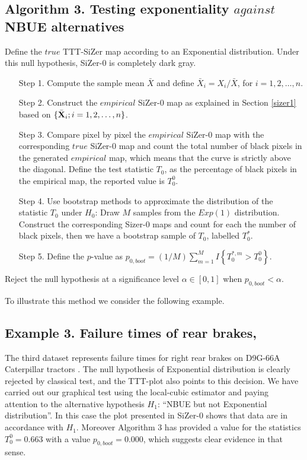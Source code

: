 \documentclass[preprint,12pt]{elsarticle}
\begin{document}
\subsection*{Algorithm 3. Testing exponentiality $against$ NBUE alternatives} 
Define the $true$ TTT-SiZer map according to an Exponential distribution. Under this null hypothesis, SiZer-0 is completely dark gray. 
\begin{enumerate}
\item[Step 1.] Compute the sample mean $\bar{X}$ and define $\bar{X}_i=X_i/\bar{X}$, for $ i=1,2,\ldots,n$.
\item[Step 2.] Construct the  $empirical$ SiZer-$0$ map as explained in Section \ref{sizer1} based on  $\{\bar{\bf X}_i; i=1, 2,\ldots, n \}$.
\item[Step 3.] Compare pixel by pixel the $empirical$ SiZer-$0$ map with the corresponding $true$ SiZer-$0$ map and count the total number of black pixels in the generated $empirical$ map, which means that the curve is strictly above the diagonal. Define the test statistic $T_0$, as the percentage of black pixels in the empirical map, the reported value is $T_0^0$.

\item[Step 4.] Use bootstrap methods to approximate the distribution of the statistic $T_0$ under $H_0$: Draw $M$ samples from the $Exp(1)$ distribution. Construct the corresponding Sizer-$0$ maps and count for each the number of black pixels, then we have a bootstrap sample of $T_0$, labelled $T^*_0$.

\item[Step 5.] Define the $p$-value as $p_{0,boot}=(1/M)\sum_{m=1}^M I\left\{T^{*,m}_0 > T_0^0\right\}$.
\end{enumerate}
Reject the null hypothesis at a significance level $\alpha \in [0,1]$ when $p_{0,boot} < \alpha$. %

To illustrate this method we consider the following example. 
\subsection*{Example 3. Failure times of rear brakes, \cite{BC75}}
The third dataset represents failure times for right rear brakes on D9G-66A Caterpillar tractors \cite{BC75}. The null hypothesis of Exponential distribution is clearly rejected by classical test, and the TTT-plot also points to this decision. We have carried out our graphical test using the local-cubic estimator and paying attention to the alternative hypothesis $H_1$: ``NBUE but not Exponential distribution''. In this case the plot presented in SiZer-0 shows that data are in accordance with $H_1$. Moreover Algorithm 3 has provided a value for the statistics $T_0^0=0.663$ with a value $p_{0,boot}=0.000$, which suggests clear evidence in that sense. 
\end{document}
